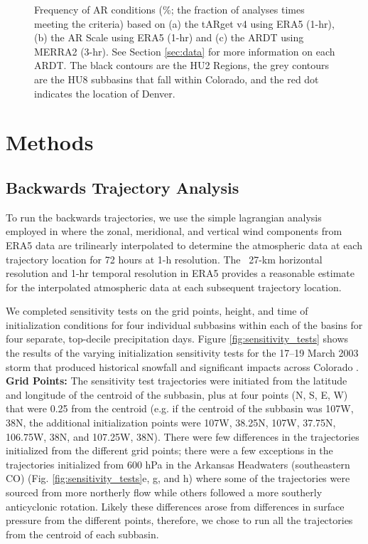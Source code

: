 \documentclass[draft]{agujournal2019}
\begin{document}
\begin{figure}
\label{fig:ar_overhead}
\caption{Frequency of AR conditions (\%; the fraction of analyses times meeting the criteria)  based on (a) the  tARget v4 using ERA5 (1-hr), (b) the AR Scale \cite{MartinRalph2019} using ERA5 (1-hr) and (c) the  ARDT using MERRA2 (3-hr). See Section \ref{sec:data} for more information on each ARDT. The black contours are the HU2 Regions, the grey contours are the HU8 subbasins that fall within Colorado, and the red dot indicates the location of Denver.}
\end{figure}

\section{Methods}
\label{sec:methods}
\subsection{Backwards Trajectory Analysis}

To run the backwards trajectories, we use the simple lagrangian analysis employed in  where the zonal, meridional, and vertical wind components from ERA5 data are trilinearly interpolated to determine the atmospheric data at each trajectory location for 72 hours at 1-h resolution. The ~27-km horizontal resolution and 1-hr temporal resolution in ERA5 provides a reasonable estimate for the interpolated atmospheric data at each subsequent trajectory location.

We completed sensitivity tests on the grid points, height, and time of initialization conditions for four individual subbasins within each of the basins for four separate, top-decile precipitation days. Figure \ref{fig:sensitivity_tests} shows the results of the varying initialization sensitivity tests for the 17--19 March 2003 storm that produced historical snowfall and significant impacts across Colorado \cite{Wesley2013Extreme2003}. \textbf{Grid Points:} The sensitivity test trajectories were initiated from the latitude and longitude of the centroid of the subbasin, plus at four points (N, S, E, W) that were 0.25\textdegree{} from the centroid (e.g. if the centroid of the subbasin was 107\textdegree W, 38\textdegree N, the additional initialization points were 107\textdegree W, 38.25\textdegree N, 107\textdegree W, 37.75\textdegree N, 106.75\textdegree W, 38\textdegree N, and 107.25\textdegree W, 38\textdegree N). There were few differences in the trajectories initialized from the different grid points; there were a few exceptions in the trajectories initialized from 600 hPa in the Arkansas Headwaters (southeastern CO) (Fig. \ref{fig:sensitivity_tests}e, g, and h) where some of the trajectories were sourced from more northerly flow while others followed a more southerly anticyclonic rotation. Likely these differences arose from differences in surface pressure from the different points, therefore, we chose to run all the trajectories from the centroid of each subbasin.
\end{document}

